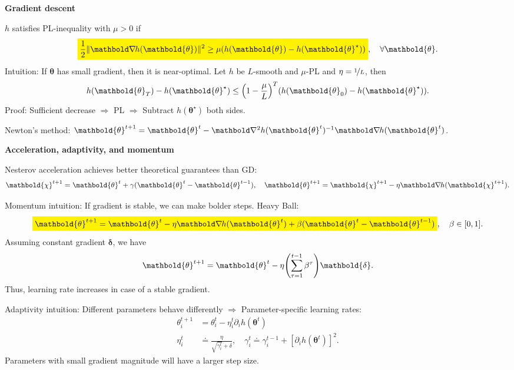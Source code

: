 \documentclass[10pt]{article}
\newenvironment{topic}[1]
{\textbf{\sffamily \footnotesize \colorbox{black}{\rlap{\textbf{\textcolor{white}{#1}}}\hspace{\linewidth}\hspace{-2\fboxsep}}}}
{}
\newenvironment{subtopic}[1]
{\begin{center}\textbf{\footnotesize \sffamily #1}\end{center}}
{}
\renewcommand{\vec}[1]{\ensuremath{\mathbold{#1}}}
\begin{document}
\begin{multicols*}{3}
\begin{topic}{Gradient-based learning}
\begin{subtopic}{Gradient descent}
            $h$ satisfies PL-inequality with $\mu > 0$ if \[
                \colorbox{yellow}{$\displaystyle \frac{1}{2} \| \grad{h(\vec{\theta})}{} \|^2 \geq \mu (h(\vec{\theta}) - h(\vec{\theta}^\star))$}, \quad \forall \vec{\theta}.
            \]
            Intuition: If $\vec{\theta}$ has small gradient, then it is near-optimal. Let $h$ be $L$-smooth and
            $\mu$-PL and $\eta = \nicefrac{1}{L}$, then \[
                h(\vec{\theta}_T) - h(\vec{\theta}^\star) \leq \lft( 1 - \frac{\mu}{L} \rgt)^T (h(\vec{\theta}_0) - h(\vec{\theta}^\star)).
            \]
            Proof: Sufficient decrease $\Rightarrow$ PL $\Rightarrow$ Subtract $h(\vec{\theta}^\star)$ both sides.

            Newton's method: $\vec{\theta}^{t+1} = \vec{\theta}^t - \inv{\hess{h(\vec{\theta}^t)}{}} \grad{h(\vec{\theta}^t)}{}$.
            
        \end{subtopic}

        \begin{subtopic}{Acceleration, adaptivity, and momentum}
            Nesterov acceleration achieves better theoretical guarantees than GD: \[
                \vec{\chi}^{t+1} = \vec{\theta}^t + \gamma(\vec{\theta}^t - \vec{\theta}^{t-1}), \quad \vec{\theta}^{t+1} = \vec{\chi}^{t+1} - \eta \grad{h(\vec{\chi}^{t+1})}{}.
            \]

            Momentum intuition: If gradient is stable, we can make bolder steps. Heavy Ball: \[
                \colorbox{yellow}{$\displaystyle \vec{\theta}^{t+1} = \vec{\theta}^t - \eta \grad{h(\vec{\theta}^t)}{} + \beta (\vec{\theta}^t - \vec{\theta}^{t-1})$}, \quad \beta \in [0,1].
            \]
            Assuming constant gradient $\vec{\delta}$, we have \[
                \vec{\theta}^{t+1} = \vec{\theta}^t - \eta \lft( \sum_{\tau=1}^{t-1} \beta^{\tau} \rgt) \vec{\delta}.
            \]
            Thus, learning rate increases in case of a stable gradient.

            Adaptivity intuition: Different parameters behave differently $\Rightarrow$ Parameter-specific learning
            rates:
            \begin{align*}
                \theta_i^{t+1} & = \theta_i^t - \eta_i^t \partial_i h(\vec{\theta}^t)                                                                       \\
                \eta_i^t       & \doteq \frac{\eta}{\sqrt{\gamma_i^t} + \delta}, \quad \gamma_i^t \doteq \gamma_i^{t-1} + [\partial_i h(\vec{\theta}^t)]^2.
            \end{align*}
            Parameters with small gradient magnitude will have a larger step size.


\end{subtopic}
\end{topic}
\end{multicols*}
\end{document}
